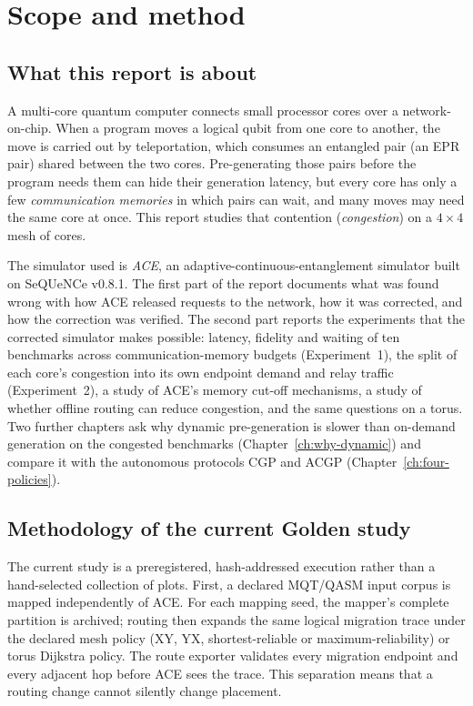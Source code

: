 \chapter{Scope and method}

\section{What this report is about}
A multi-core quantum computer connects small processor cores over a network-on-chip. When a program moves a logical qubit
from one core to another, the move is carried out by teleportation, which consumes an entangled pair (an EPR pair)
shared between the two cores. Pre-generating those pairs before the program needs them can hide their generation latency,
but every core has only a few \emph{communication memories} in which pairs can wait, and many moves may need the same
core at once. This report studies that contention (\emph{congestion}) on a $4\times4$ mesh of cores.

The simulator used is \emph{ACE}, an adaptive-continuous-entanglement simulator built on SeQUeNCe v0.8.1. The first part of the
report documents what was found wrong with how ACE released requests to the network, how it was corrected, and how the
correction was verified. The second part reports the experiments that the corrected simulator makes possible:
latency, fidelity and waiting of ten benchmarks across communication-memory budgets (Experiment~1), the split of each
core's congestion into its own endpoint demand and relay traffic (Experiment~2), a study of ACE's memory cut-off
mechanisms, a study of whether offline routing can reduce congestion, and the same questions on a torus. Two further chapters ask why dynamic pre-generation is slower than on-demand generation on the congested benchmarks (Chapter~\ref{ch:why-dynamic}) and compare it with the autonomous protocols CGP and ACGP (Chapter~\ref{ch:four-policies}).

\section{Methodology of the current Golden study}
The current study is a preregistered, hash-addressed execution rather than a
hand-selected collection of plots. First, a declared MQT/QASM input corpus is
mapped independently of ACE. For each mapping seed, the mapper's complete
partition is archived; routing then expands the same logical migration trace
under the declared mesh policy (XY, YX, shortest-reliable or maximum-reliability)
or torus Dijkstra policy. The route exporter validates every migration endpoint
and every adjacent hop before ACE sees the trace. This separation means that a
routing change cannot silently change placement.

